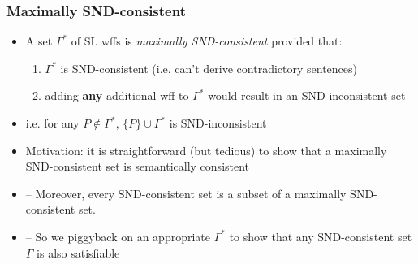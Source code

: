 \begin{frame}
\frametitle{Maximally SND-consistent}

\begin{itemize}[<+->]

\item A set $\Gamma^{\ast}$ of SL wffs is \emph{maximally SND-consistent} provided that:

\begin{enumerate}[1.)]

\item $\Gamma^{\ast}$ is SND-consistent (i.e. can't derive contradictory sentences)

\item adding \textbf{any} additional wff to $\Gamma^{\ast}$ would result in an SND-\textcolor{OGlyallpink}{inconsistent} set

\end{enumerate} 

\item i.e. for any $P \notin \Gamma^{\ast}$, $\{P\} \cup \Gamma^{\ast}$ is SND-\textcolor{OGlyallpink}{inconsistent}

\item Motivation: it is straightforward (but tedious) to show that a maximally SND-consistent set is semantically consistent

\item[] -- Moreover, every SND-consistent set is a subset of a maximally SND-consistent set. \item[] -- So we piggyback on an appropriate $\Gamma^{\ast}$ to show that any SND-consistent set $\Gamma$ is also \alert{satisfiable} %

\end{itemize}
\end{frame}


